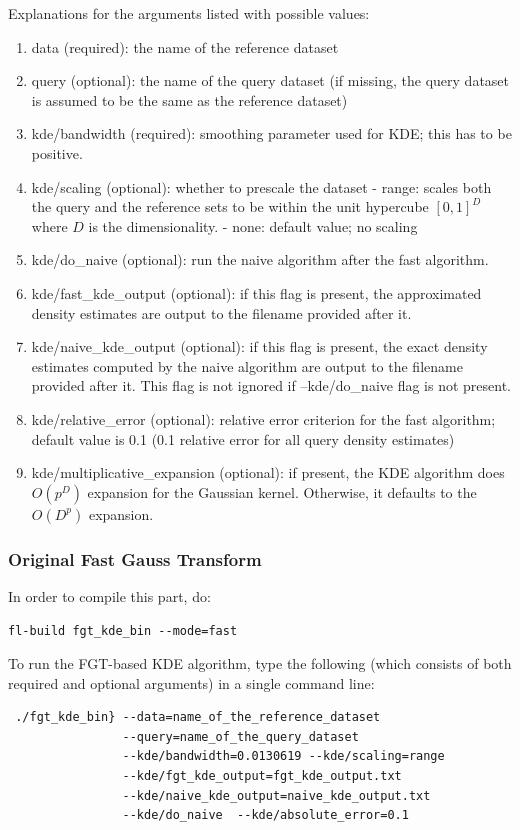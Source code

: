 \documentclass[letter]{report}
\begin{document}
Explanations for the arguments listed with possible values:

\begin{enumerate}
\item{data (required): the name of the reference dataset}
\item{query (optional): the name of the query dataset (if missing, the
 query dataset is assumed to be the same as the reference dataset)}
\item{kde/bandwidth (required): smoothing parameter used for KDE; this
 has to be positive.}
\item{kde/scaling (optional): whether to prescale the dataset - range:
scales both the query and the reference sets to be within the unit
hypercube $[0, 1]^D$ where $D$ is the dimensionality.  - none: default
value; no scaling}
\item{kde/do\_naive (optional): run the naive algorithm after the fast
algorithm.}
\item{kde/fast\_kde\_output (optional): if this flag is present, the
approximated density estimates are output to the filename provided
after it.}
\item{kde/naive\_kde\_output (optional): if this flag is present, the
 exact density estimates computed by the naive algorithm are output to
 the filename provided after it. This flag is not ignored if
 --kde/do\_naive flag is not present.}
\item{kde/relative\_error (optional): relative error criterion for the
 fast algorithm; default value is 0.1 (0.1 relative error for all
 query density estimates)}
\item{kde/multiplicative\_expansion (optional): if present, the KDE
algorithm does $O(p^D)$ expansion for the Gaussian kernel. Otherwise,
it defaults to the $O(D^p)$ expansion.}
\end{enumerate}

\subsubsection{Original Fast Gauss Transform}
In order to compile this part, do: 
\begin{verbatim}
fl-build fgt_kde_bin --mode=fast
\end{verbatim}

 To run the FGT-based KDE algorithm, type the
following (which consists of both required and optional arguments) in
a single command line:
\begin{verbatim}
 ./fgt_kde_bin} --data=name_of_the_reference_dataset
                --query=name_of_the_query_dataset
                --kde/bandwidth=0.0130619 --kde/scaling=range
                --kde/fgt_kde_output=fgt_kde_output.txt
                --kde/naive_kde_output=naive_kde_output.txt
                --kde/do_naive  --kde/absolute_error=0.1
\end{verbatim}
\end{document}
